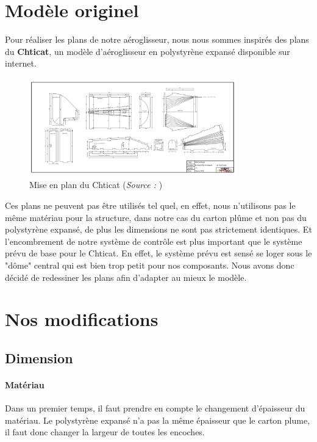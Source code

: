 \documentclass[a4paper,12pt]{book}
\begin{document}
		\section{Modèle originel}
		Pour réaliser les plans de notre aéroglisseur, nous nous sommes inspirés des plans du \textbf{Chticat}, un modèle d'aéroglisseur en polystyrène expansé disponible sur internet.
		\begin{figure}[h]
			\begin{center}
				 \includegraphics[width=0.8\textwidth]{../Illus/Source_Chticat}
			\end{center}
			\caption{Mise en plan du Chticat (\textit{Source :} \cite{chticat})}
			\label{MEPChticat}
		\end{figure}
		Ces plans ne peuvent pas être utilisés tel quel, en effet, nous n'utilisons pas le même matériau pour la structure, dans notre cas du carton plûme et non pas du polystyrène expansé, de plus les dimensions ne sont pas strictement identiques. Et l'encombrement de notre système de contrôle est plus important que le système prévu de base pour le Chticat. En effet, le système prévu est sensé se loger sous le "dôme" central qui est bien trop petit pour nos composants. Nous avons donc décidé de redessiner les plans afin d'adapter au mieux le modèle.
		\section{Nos modifications}
			\subsection{Dimension}
				\paragraph{Matériau}Dans un premier temps, il faut prendre en compte le changement d'épaisseur du matériau. Le polystyrène expansé n'a pas la même épaisseur que le carton plume, il faut donc changer la largeur de toutes les encoches.
\end{document}
